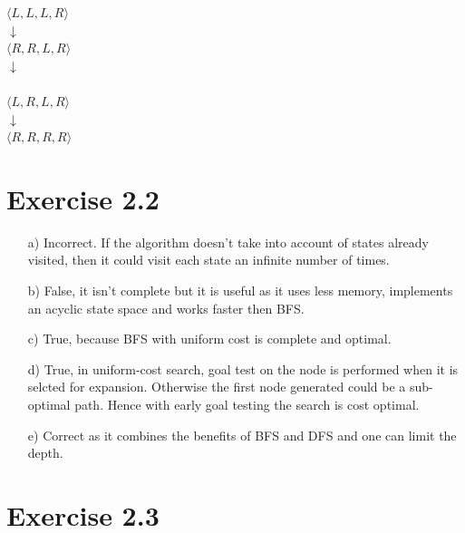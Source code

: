 \documentclass[12pt]{article}
\begin{document}
$\langle L,L,L,R \rangle$ \\ \hspace*{35mm}%
$\downarrow$ \\ \hspace*{25mm}%
$\langle R,R,L,R \rangle$ \\ \hspace*{35mm}%
$\downarrow$ \\ \\ \hspace*{25mm}%
$\langle L,R,L,R \rangle$ \\ \hspace*{35mm}%
$\downarrow$ \\ \hspace*{25mm}%
$\langle R,R,R,R \rangle$ \newpage


\section*{Exercise 2.2}

\begin{enumerate}
    \item[a)] Incorrect. If the algorithm doesn't take into account of states already visited, then it could visit each state an infinite number of times. 
    \item[b)] False, it isn't complete but it is useful as it uses less memory, implements an acyclic state space and works faster then BFS.  
    \item[c)] True, because BFS with uniform cost is complete and optimal.
    \item[d)] True, in uniform-cost search, goal test on the node is performed when it is selcted for expansion. Otherwise the first node generated could be a sub-optimal path. Hence with early goal testing the search is cost optimal.
    \item[e)] Correct as it combines the benefits of BFS and DFS and one can limit the depth.\newline
\end{enumerate}

\section*{Exercise 2.3}

\end{document}
